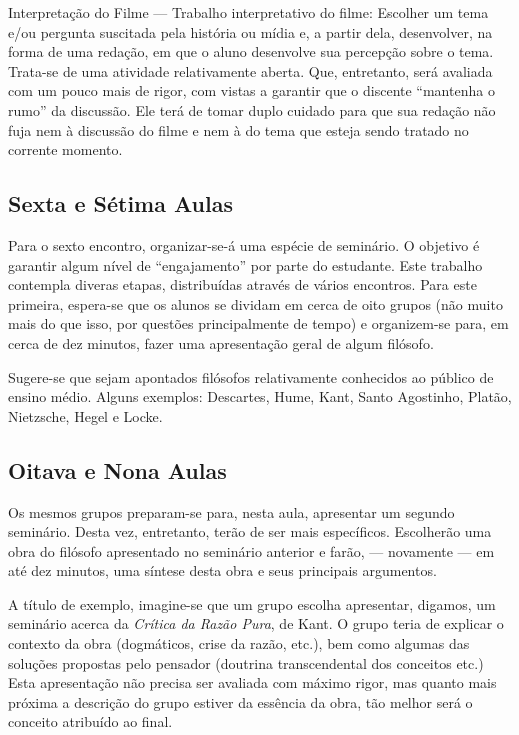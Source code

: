 \documentclass[12pt,a4paper]{article}
\begin{document}
	Interpretação do Filme --- Trabalho interpretativo do filme:
	Escolher um tema e/ou pergunta suscitada pela história ou 
	mídia e, a partir dela, desenvolver, na forma de uma redação, 
	em que o aluno desenvolve sua percepção sobre o tema. Trata-se 
	de uma atividade relativamente aberta. Que, entretanto, será 
	avaliada com um pouco mais de rigor, com vistas a garantir 
	que o discente ``mantenha o rumo'' da discussão. Ele terá de 
	tomar duplo cuidado para que sua redação não fuja nem à 
	discussão do filme e nem à do tema que esteja sendo tratado 
	no corrente momento. 

	\subsection*{Sexta e Sétima Aulas}
	
	Para o sexto encontro, organizar-se-á uma espécie de seminário. 
	O objetivo é garantir algum nível de ``engajamento'' por parte 
	do estudante. Este trabalho contempla diveras etapas, distribuídas 
	através de vários encontros. Para este primeira, espera-se que 
	os alunos se dividam em cerca de oito grupos (não muito mais do que 
	isso, por questões principalmente de tempo) e organizem-se para, 
	em cerca de dez minutos, fazer uma apresentação geral de algum
	filósofo. 
	
	Sugere-se que sejam apontados filósofos relativamente conhecidos 
	ao público de ensino médio. Alguns exemplos: Descartes, Hume, 
	Kant, Santo Agostinho, Platão, Nietzsche, Hegel e Locke. 
	
	\subsection*{Oitava e Nona Aulas}
	
	Os mesmos grupos preparam-se para, nesta aula, apresentar um 
	segundo seminário. Desta vez, entretanto, terão de ser mais 
	específicos. Escolherão uma obra do filósofo apresentado no 
	seminário anterior e farão, --- novamente --- em até dez minutos, 
	uma síntese desta obra e seus principais argumentos. 
	
	A título de exemplo, imagine-se que um grupo escolha apresentar, 
	digamos, um seminário acerca da \textit{Crítica da Razão Pura}, 
	de Kant. O grupo teria de explicar o contexto da obra (dogmáticos, 
	crise da razão, etc.), bem como algumas das soluções propostas 
	pelo pensador (doutrina transcendental dos conceitos etc.) Esta 
	apresentação não precisa ser avaliada com máximo rigor, mas quanto 
	mais próxima a descrição do grupo estiver da essência da obra, 
	tão melhor será o conceito atribuído ao final. 
	
\end{document}
